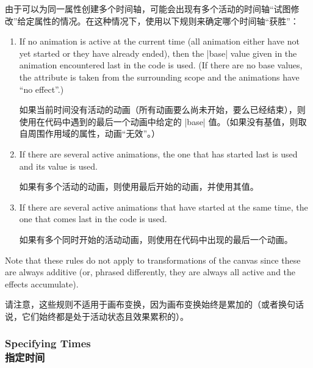 由于可以为同一属性创建多个时间轴，可能会出现有多个活动的时间轴“试图修改”给定属性的情况。在这种情况下，使用以下规则来确定哪个时间轴“获胜”：


\begin{enumerate}
    \item If no animation is active at the current time (all animation either
        have not yet started or they have already ended), then the |base| value
        given in the animation encountered last in the code is used. (If there
        are no base values, the attribute is taken from the surrounding scope
        and the animations have ``no effect''.)

        如果当前时间没有活动的动画（所有动画要么尚未开始，要么已经结束），则使用在代码中遇到的最后一个动画中给定的 |base| 值。（如果没有基值，则取自周围作用域的属性，动画“无效”。）


    \item If there are several active animations, the one that has started last
        is used and its value is used.

        如果有多个活动的动画，则使用最后开始的动画，并使用其值。


    \item If there are several active animations that have started at the same
        time, the one that comes last in the code is used.

        如果有多个同时开始的活动动画，则使用在代码中出现的最后一个动画。


\end{enumerate}

Note that these rules do not apply to transformations of the canvas since these
are always additive (or, phrased differently, they are always all active and
the effects accumulate).

请注意，这些规则不适用于画布变换，因为画布变换始终是累加的（或者换句话说，它们始终都是处于活动状态且效果累积的）。


\subsubsection{Specifying Times\\指定时间}
\label{section-anim-def-times}

